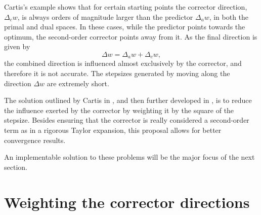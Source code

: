Cartis's example \cite{Cartis04} shows that for certain 
starting points the corrector direction, $\Delta_c w$,
is always orders of magnitude larger than the predictor $\Delta_a w$, in both 
the primal and dual spaces.
In these cases, while the predictor points towards 
the optimum, the second-order corrector points away from it.
As the final direction is given by
\[
\Delta w = \Delta_a w  +\Delta_c w,
\]
the combined direction is influenced almost exclusively by the corrector, 
and therefore it is not accurate. 
The stepsizes generated by moving along the direction $\Delta w$
are extremely short.

The solution outlined by Cartis in \cite{Cartis04}, and then further 
developed in \cite{Cartis05}, is to reduce the influence exerted by 
the corrector by weighting it by the square of the stepsize. 
Besides ensuring that the corrector is really considered 
a second-order term as in a rigorous Taylor expansion, 
this proposal allows for better convergence results.



An implementable solution to these problems will be the
major focus of the next section.


%
%
\section{Weighting the corrector directions}
\label{sec:WeightedCorrectors}


